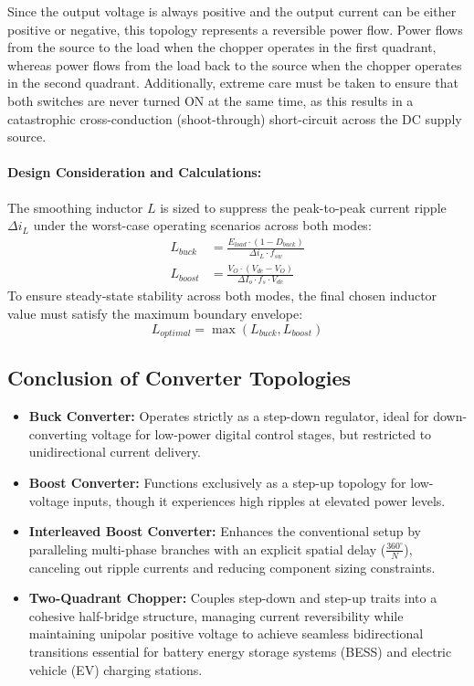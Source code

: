 Since the output voltage is always positive and the output current can be either positive or negative, this topology represents a reversible power flow. Power flows from the source to the load when the chopper operates in the first quadrant, whereas power flows from the load back to the source when the chopper operates in the second quadrant. Additionally, extreme care must be taken to ensure that both switches are never turned ON at the same time, as this results in a catastrophic cross-conduction (shoot-through) short-circuit across the DC supply source.

\paragraph{Design Consideration and Calculations:}
The smoothing inductor $L$ is sized to suppress the peak-to-peak current ripple $\Delta i_L$ under the worst-case operating scenarios across both modes:
\begin{align}
    L_{buck} &= \frac{E_{load} \cdot (1 - D_{buck})}{\Delta i_L \cdot f_{sw}} \\
    L_{boost} &= \frac{V_O \cdot (V_{dc} - V_O)}{\Delta I_o \cdot f_s \cdot V_{dc}}
\end{align}
To ensure steady-state stability across both modes, the final chosen inductor value must satisfy the maximum boundary envelope:
\begin{equation}
    L_{optimal} = \max(L_{buck}, L_{boost})
\end{equation}
\newpage
\subsection{Conclusion of Converter Topologies}
\begin{itemize}
    \item \textbf{Buck Converter:} Operates strictly as a step-down regulator, ideal for down-converting voltage for low-power digital control stages, but restricted to unidirectional current delivery.
    \item \textbf{Boost Converter:} Functions exclusively as a step-up topology for low-voltage inputs, though it experiences high ripples at elevated power levels.
    \item \textbf{Interleaved Boost Converter:} Enhances the conventional setup by paralleling multi-phase branches with an explicit spatial delay ($\frac{360^\circ}{N}$), canceling out ripple currents and reducing component sizing constraints.
    \item \textbf{Two-Quadrant Chopper:} Couples step-down and step-up traits into a cohesive half-bridge structure, managing current reversibility while maintaining unipolar positive voltage to achieve seamless bidirectional transitions essential for battery energy storage systems (BESS) and electric vehicle (EV) charging stations.
\end{itemize}